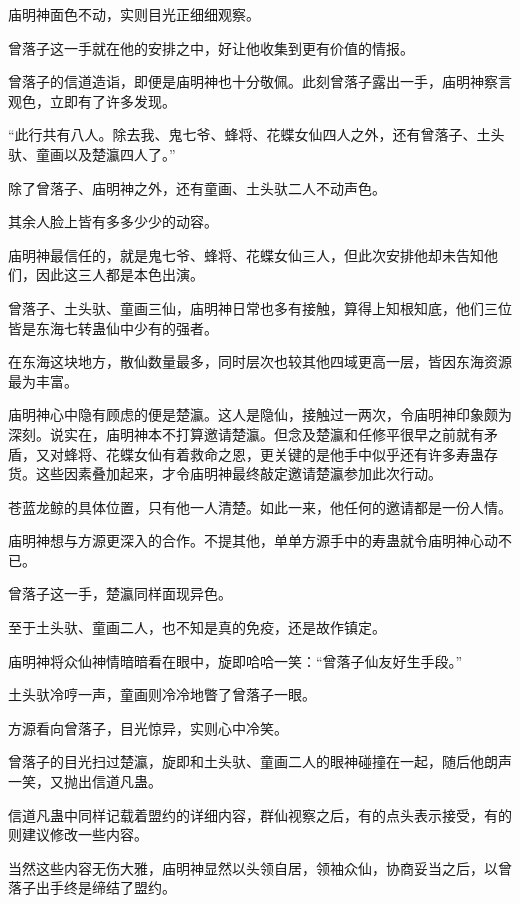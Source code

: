 
\begin{this_body}

庙明神面色不动，实则目光正细细观察。

曾落子这一手就在他的安排之中，好让他收集到更有价值的情报。

曾落子的信道造诣，即便是庙明神也十分敬佩。此刻曾落子露出一手，庙明神察言观色，立即有了许多发现。

“此行共有八人。除去我、鬼七爷、蜂将、花蝶女仙四人之外，还有曾落子、土头驮、童画以及楚瀛四人了。”

除了曾落子、庙明神之外，还有童画、土头驮二人不动声色。

其余人脸上皆有多多少少的动容。

庙明神最信任的，就是鬼七爷、蜂将、花蝶女仙三人，但此次安排他却未告知他们，因此这三人都是本色出演。

曾落子、土头驮、童画三仙，庙明神日常也多有接触，算得上知根知底，他们三位皆是东海七转蛊仙中少有的强者。

在东海这块地方，散仙数量最多，同时层次也较其他四域更高一层，皆因东海资源最为丰富。

庙明神心中隐有顾虑的便是楚瀛。这人是隐仙，接触过一两次，令庙明神印象颇为深刻。说实在，庙明神本不打算邀请楚瀛。但念及楚瀛和任修平很早之前就有矛盾，又对蜂将、花蝶女仙有着救命之恩，更关键的是他手中似乎还有许多寿蛊存货。这些因素叠加起来，才令庙明神最终敲定邀请楚瀛参加此次行动。

苍蓝龙鲸的具体位置，只有他一人清楚。如此一来，他任何的邀请都是一份人情。

庙明神想与方源更深入的合作。不提其他，单单方源手中的寿蛊就令庙明神心动不已。

曾落子这一手，楚瀛同样面现异色。

至于土头驮、童画二人，也不知是真的免疫，还是故作镇定。

庙明神将众仙神情暗暗看在眼中，旋即哈哈一笑：“曾落子仙友好生手段。”

土头驮冷哼一声，童画则冷冷地瞥了曾落子一眼。

方源看向曾落子，目光惊异，实则心中冷笑。

曾落子的目光扫过楚瀛，旋即和土头驮、童画二人的眼神碰撞在一起，随后他朗声一笑，又抛出信道凡蛊。

信道凡蛊中同样记载着盟约的详细内容，群仙视察之后，有的点头表示接受，有的则建议修改一些内容。

当然这些内容无伤大雅，庙明神显然以头领自居，领袖众仙，协商妥当之后，以曾落子出手终是缔结了盟约。


\end{this_body}
